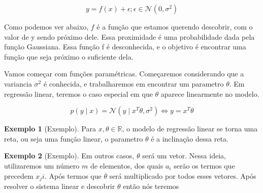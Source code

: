 \documentclass[a4paper, 12pt]{scrartcl}
\theoremstyle{plain}%
\theoremstyle{definition}
\newtheorem{exmp}{Exemplo}
\theoremstyle{remark}
\def \Real {\mathds{R}}
\begin{document}
\[
    y = f(x)+\epsilon ; \epsilon \in  \mathcal{N}(0,\sigma^2)
\]

Como podemos ver abaixo, $f$ é a função que estamos querendo descobrir, com o valor de y sendo próximo dele. Essa proximidade é uma probabilidade dada pela função Gaussiana.
Essa função f é desconhecida, e o objetivo é encontrar uma função que seja próximo o suficiente dela.

Vamos começar com funções paramétricas. Começaremos considerando que a variancia $\sigma^2$ é conhecida, e trabalharemos em encontrar um parametro $\theta$. 
Em regressão linear, teremos o caso especial em que $\theta$ aparece linearmente no modelo.

\[
    p(y\mid x) = \mathcal{N}(y\mid x^T\theta, \sigma^2) \Leftrightarrow y = x^T\theta
\]

\begin{exmp}[Exemplo]\label{exmp: B} 
Para $ x,\theta \in \Real $, o modelo de regressão linear se torna uma reta, ou seja uma função linear,
o parametro $\theta $ é a inclinação dessa reta.
\end{exmp}




\begin{exmp}[Exemplo]\label{exmp: B} 
Em outros casos, $\theta$ será um vetor. Nessa ideia, utilizaremos um número $m$ de elementos, dos quais $a_i$ serão os termos que precedem ${x_j}i$. Após termos que $\theta$ será multiplicado por todos esses vetores.
Após resolver o sistema linear e descobrir $\theta$ então nós teremos
\end{exmp}



\end{document}
